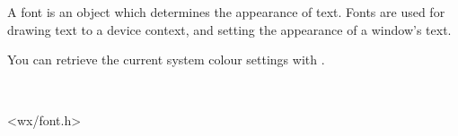 \section{}\label{wxfont}

A font is an object which determines the appearance of text. Fonts are
used for drawing text to a device context, and setting the appearance of
a window's text.

You can retrieve the current system colour settings with .


\\


<wx/font.h>



